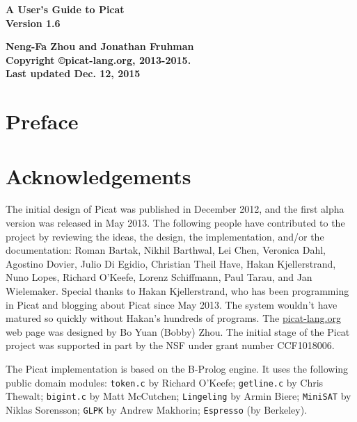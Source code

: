 \documentclass[11pt]{report}
\newcommand{\ignore}[1]{}
\begin{document}
\vspace*{4cm}
\begin{center}
{\Huge\bf A User's Guide to Picat} \\
{\large\bf Version 1.6} \\



\vspace*{8cm}

{\large\bf Neng-Fa Zhou and Jonathan Fruhman} \\
\vspace*{1cm}
{\bf Copyright \copyright picat-lang.org, 2013-2015.} \\
{\bf Last updated Dec. 12, 2015} \\
\end{center}
\thispagestyle{empty}
\clearpage

\pagestyle{plain}

\section*{Preface}


\section*{Acknowledgements}
The initial design of Picat was published in December 2012, and the first alpha version was released in May 2013.  The following people have contributed to the project by reviewing the ideas, the design, the implementation, and/or the documentation: Roman Bartak, Nikhil Barthwal, Lei Chen, Veronica Dahl, Agostino Dovier, Julio Di Egidio, Christian Theil Have, Hakan Kjellerstrand,  Nuno Lopes, Richard O'Keefe, Lorenz Schiffmann, Paul Tarau, and Jan Wielemaker.  Special thanks to Hakan Kjellerstrand, who has been programming in Picat and blogging about Picat since May 2013. The system wouldn't have matured so quickly without Hakan's hundreds of programs. The \url{picat-lang.org} web page was designed by Bo Yuan (Bobby) Zhou. The initial stage of the Picat project was supported in part by the NSF under grant number CCF1018006.

The Picat implementation is based on the B-Prolog engine. It uses the following public domain modules: \ignore{\texttt{prism} by Taisuke Sato and Yoshitaka Kameya; }\texttt{token.c} by Richard O'Keefe; \texttt{getline.c} by Chris Thewalt; \texttt{bigint.c} by Matt McCutchen; \texttt{Lingeling} by Armin Biere; \texttt{MiniSAT} by Niklas Sorensson; \texttt{GLPK} by Andrew Makhorin; \texttt{Espresso} (by Berkeley).
\end{document}
